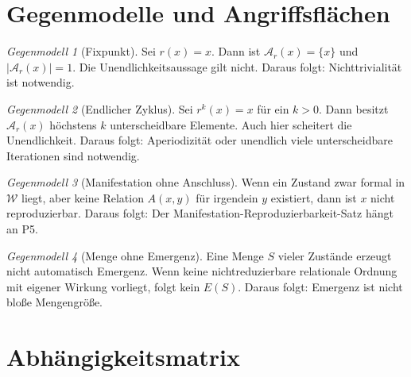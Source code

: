 \documentclass[11pt,a4paper]{article}
\theoremstyle{remark}
\newtheorem{gegenmodell}{Gegenmodell}[section]
\newcommand{\W}{\mathcal{W}}
\newcommand{\A}{\mathcal{A}}
\begin{document}
\section{Gegenmodelle und Angriffsflächen}

\begin{gegenmodell}[Fixpunkt]
Sei $r(x)=x$. Dann ist $\A_r(x)=\{x\}$ und $|\A_r(x)|=1$. Die Unendlichkeitsaussage gilt nicht. Daraus folgt: Nichttrivialität ist notwendig.
\end{gegenmodell}

\begin{gegenmodell}[Endlicher Zyklus]
Sei $r^k(x)=x$ für ein $k>0$. Dann besitzt $\A_r(x)$ höchstens $k$ unterscheidbare Elemente. Auch hier scheitert die Unendlichkeit. Daraus folgt: Aperiodizität oder unendlich viele unterscheidbare Iterationen sind notwendig.
\end{gegenmodell}

\begin{gegenmodell}[Manifestation ohne Anschluss]
Wenn ein Zustand zwar formal in $\W$ liegt, aber keine Relation $A(x,y)$ für irgendein $y$ existiert, dann ist $x$ nicht reproduzierbar. Daraus folgt: Der Manifestation-Reproduzierbarkeit-Satz hängt an P5.
\end{gegenmodell}

\begin{gegenmodell}[Menge ohne Emergenz]
Eine Menge $S$ vieler Zustände erzeugt nicht automatisch Emergenz. Wenn keine nichtreduzierbare relationale Ordnung mit eigener Wirkung vorliegt, folgt kein $E(S)$. Daraus folgt: Emergenz ist nicht bloße Mengengröße.
\end{gegenmodell}

\section{Abhängigkeitsmatrix}
\end{document}
